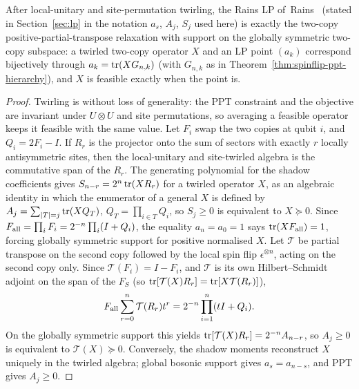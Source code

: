 \begin{proposition}\label{prop:rainsppt}
After local-unitary and site-permutation twirling, the Rains LP
of~Rains~\cite{Rains} (stated in Section~\ref{sec:lp} in the notation $a_s$, $A_j$, $S_j$ used here) is exactly the two-copy positive-partial-transpose
relaxation with support on the globally symmetric two-copy subspace: a twirled two-copy operator $X$
and an LP point $(a_k)$ correspond bijectively through $a_k=\operatorname{tr}(XG_{n,k})$ (with $G_{n,k}$ as in
Theorem~\ref{thm:spinflip-ppt-hierarchy}), and $X$ is feasible exactly when the point is.
\end{proposition}
\begin{proof}
Twirling is without loss of generality: the PPT constraint and the objective are invariant under
$U\otimes U$ and site permutations, so averaging a feasible operator keeps it feasible with the same value.
Let $F_i$ swap the two copies at qubit $i$, and $Q_i=2F_i-I$.
If $R_r$ is the projector onto the sum of sectors with exactly $r$
locally antisymmetric sites, then the local-unitary and site-twirled
algebra is the commutative span of the $R_r$. The generating
polynomial for the shadow coefficients gives
$S_{n-r}=2^n\operatorname{tr}(XR_r)$ for a twirled operator $X$, as an algebraic identity in which the enumerator of a
general $X$ is defined by $A_j=\sum_{|T|=j}\operatorname{tr}(XQ_T)$, $Q_T=\prod_{i\in T}Q_i$, so
$S_j\geq0$ is equivalent to $X\succeq0$.
Since $F_{\rm all}=\prod_iF_i=2^{-n}\prod_i(I+Q_i)$, the equality
$a_n=a_0=1$ says $\operatorname{tr}(XF_{\rm all})=1$, forcing globally
symmetric support for positive normalised $X$.
Let $\mathcal T$ be partial transpose on the second copy followed by
the local spin flip $\epsilon^{\otimes n}$, acting on the second copy only. Since
$\mathcal T(F_i)=I-F_i$, and $\mathcal T$ is its own Hilbert--Schmidt adjoint on the span of the $F_S$
(so $\operatorname{tr}[\mathcal T(X)R_r]=\operatorname{tr}[X\mathcal T(R_r)]$),
\[
 F_{\rm all}\sum_{r=0}^n\mathcal T(R_r)t^r
 =2^{-n}\prod_{i=1}^n(tI+Q_i).
\]
On the globally symmetric support this yields
$\operatorname{tr}[\mathcal T(X)R_r]=2^{-n}A_{n-r}$, so $A_j\geq0$ is
equivalent to $\mathcal T(X)\succeq0$. Conversely, the shadow
moments reconstruct $X$ uniquely in the twirled algebra; global
bosonic support gives $a_s=a_{n-s}$, and PPT gives $A_j\geq0$.
\end{proof}

